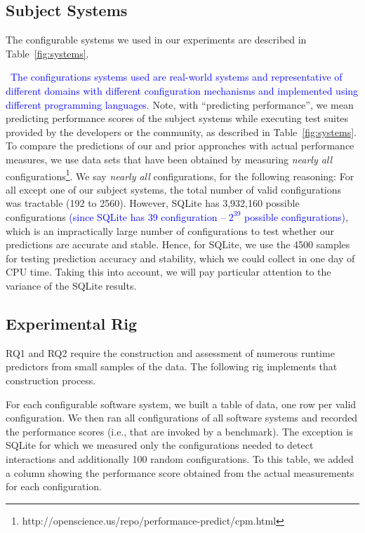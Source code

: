 \documentclass[smallextended]{svjour3}       %
\newcommand{\respto}[1]{
    \fcolorbox{black}{black!15}{
    \label{response:#1}
    \textbf{R-{#1}}}
}
\begin{document}
\subsection{Subject Systems}
\label{sec:subject_systems}
The configurable systems we used in our experiments are described in Table~\ref{fig:systems}.
\respto{2c}~\textcolor{blue}{The configurations systems used are real-world systems and representative of different  domains  with  different  configuration  mechanisms  and  implemented  using different programming languages.}
Note, with ``predicting performance'', we 
mean predicting performance scores of the subject systems while executing test suites provided by the developers or the community, as described in Table~\ref{fig:systems}.
To compare the predictions of our and prior approaches with actual performance measures, we use data sets that have been obtained by
measuring {\em nearly all} configurations\footnote{http://openscience.us/repo/performance-predict/cpm.html}.
We say {\em nearly all} configurations, for the following reasoning: For 
all except one of our subject systems, the total number of valid configurations
was tractable (192 to 2560). However,  SQLite has 3,932,160 
possible configurations \respto{2d}\textcolor{blue}{(since SQLite has 39 configuration -- $2^{39}$ possible configurations)}, which is an impractically large number of configurations to test whether our predictions are accurate and stable. Hence, for SQLite, we use the 4500 samples for testing prediction accuracy and stability, which we could collect in one day of CPU time. Taking this into account, we will pay particular attention to the variance of the SQLite results.






\subsection{Experimental Rig}


RQ1 and RQ2 require the construction and assessment of numerous runtime predictors from small samples
of the data. The following rig implements that construction process.

For each configurable software system, we built a table of data, one row per valid configuration. We then ran all configurations of all software systems
and recorded the performance scores (i.e., that are invoked by a benchmark).
The exception is SQLite for which we measured only the
configurations needed to detect interactions and additionally
100 random configurations.  
To this table, we added a column showing the performance score obtained from the actual measurements for each configuration.
\end{document}
